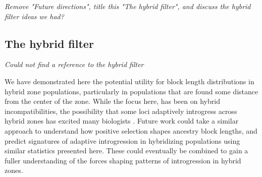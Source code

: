 \documentclass[11pt,letterpaper]{article}
\newcommand{\alisa}[1]{{\em \color{red} #1}}
\newcommand{\plr}[1]{{\em \color{blue} #1}}
\begin{document}

\plr{Remove "Future directions", title this "The hybrid filter", and discuss the hybrid filter ideas we had?}
\subsection*{The hybrid filter}
\alisa{Could not find a reference to the hybrid filter}

We have demonstrated here the potential utility for block length distributions in hybrid zone populations, particularly in populations that are found some distance from the center of the zone. While the focus here, has been on hybrid incompatibilities, the possibility that some loci adaptively introgress across hybrid zones has excited many biologists \citep{Arnold2004}. Future work could take a similar approach to understand how positive selection shapes ancestry block lengths, and predict  signatures of adaptive introgression in hybridizing populations using similar statistics presented here. These could eventually be combined to gain a fuller understanding of the forces shaping patterns of introgression in hybrid zones. 

\end{document}
